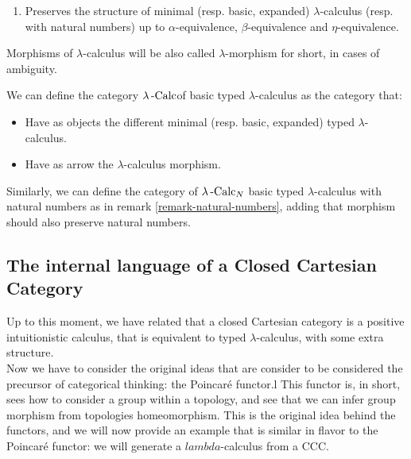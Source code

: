 \begin{definition}
\begin{definition}
\begin{enumerate}
  \item Preserves the structure of minimal (resp. basic, expanded) $\lambda$-calculus (resp. with natural numbers) up to $\alpha$-equivalence, $\beta$-equivalence and $\eta$-equivalence. 

  \end{enumerate}

  Morphisms of $\lambda$-calculus will be also called $\lambda$-morphism for short, in cases of ambiguity.
\end{definition}


\begin{definition}
  We can define the category $\lambda\operatorname{-Calc}$of basic typed $\lambda$-calculus  as the category that:
  \begin{itemize}
  \item Have as objects the different minimal (resp. basic, expanded) typed $\lambda$-calculus.
  \item Have as arrow the $\lambda$-calculus morphism.
  \end{itemize}
  Similarly, we can define the category of $\lambda\operatorname{-Calc}_N$ basic typed $\lambda$-calculus with natural numbers as in remark \ref{remark-natural-numbers}, adding that morphism should also preserve natural numbers.
\end{definition}

\subsection{The internal language of a Closed Cartesian Category}

Up to this moment, we have related that a closed Cartesian category is a positive intuitionistic calculus, that is equivalent to  typed $\lambda$-calculus, with some extra structure.\\

Now we have to consider the original ideas that are consider to be considered the precursor of categorical thinking: the Poincaré functor.l This functor is, in short,  sees how to consider a group within a topology, and see that we can infer group morphism from topologies homeomorphism. This is the original idea behind the functors, and we will now provide an example that is similar in flavor to the Poincaré functor: we will generate a $lambda$-calculus from a CCC.\\ 




\end{definition}
